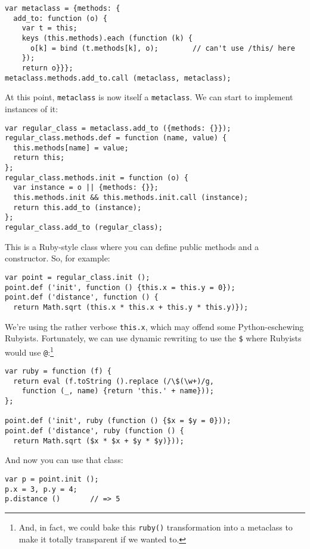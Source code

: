 \documentclass{article}
\begin{document}
\begin{verbatim}
var metaclass = {methods: {
  add_to: function (o) {
    var t = this;
    keys (this.methods).each (function (k) {
      o[k] = bind (t.methods[k], o);        // can't use /this/ here
    });
    return o}}};
metaclass.methods.add_to.call (metaclass, metaclass);
\end{verbatim}

    At this point, \verb|metaclass| is now itself a \verb|metaclass|. We can start to implement instances of it:

\begin{verbatim}
var regular_class = metaclass.add_to ({methods: {}});
regular_class.methods.def = function (name, value) {
  this.methods[name] = value;
  return this;
};
regular_class.methods.init = function (o) {
  var instance = o || {methods: {}};
  this.methods.init && this.methods.init.call (instance);
  return this.add_to (instance);
};
regular_class.add_to (regular_class);
\end{verbatim}

    This is a Ruby-style class where you can define public methods and a constructor. So, for example:

\begin{verbatim}
var point = regular_class.init ();
point.def ('init', function () {this.x = this.y = 0});
point.def ('distance', function () {
  return Math.sqrt (this.x * this.x + this.y * this.y)});
\end{verbatim}

    We're using the rather verbose \verb|this.x|, which may offend some Python-eschewing Rubyists. Fortunately, we can use dynamic rewriting to use the \verb|$| where Rubyists would use
    \verb|@|:\footnote{And, in fact, we could bake this {\tt ruby()} transformation into a metaclass to make it totally transparent if we wanted to.}

\begin{verbatim}
var ruby = function (f) {
  return eval (f.toString ().replace (/\$(\w+)/g,
    function (_, name) {return 'this.' + name}));
};

point.def ('init', ruby (function () {$x = $y = 0}));
point.def ('distance', ruby (function () {
  return Math.sqrt ($x * $x + $y * $y)}));
\end{verbatim}

    And now you can use that class:

\begin{verbatim}
var p = point.init ();
p.x = 3, p.y = 4;
p.distance ()       // => 5
\end{verbatim}
\end{document}

